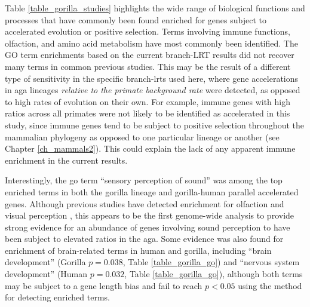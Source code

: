 Table \ref{table_gorilla_studies} highlights the wide range of
biological functions and processes that have commonly been found
enriched for genes subject to accelerated evolution or positive
selection. Terms involving immune functions, olfaction, and amino acid
metabolism have most commonly been identified. The GO term enrichments
based on the current branch-LRT results did not recover many terms in
common previous studies. This may be the result of a different type of
sensitivity in the specific branch-\acp{lrt} used here, where gene
accelerations in \ac{aga} lineages \emph{relative to the primate
  background rate} were detected, as opposed to high rates of
evolution on their own. For example, immune genes with high \dnds
ratios across all primates were not likely to be identified as
accelerated in this study, since immune genes tend to be subject to
positive selection throughout the mammalian phylogeny as opposed to
one particular lineage or another (see Chapter
\ref{ch_mammals2}). This could explain the lack of any apparent immune
enrichment in the current results.

Interestingly, the \ac{go} term ``sensory perception of sound'' was
among the top enriched terms in both the gorilla lineage and
gorilla-human parallel accelerated genes. Although previous studies
have detected enrichment for olfaction and visual perception
\citep{Clark2003,Nielsen2005,Macaque2007}, this appears to be the
first genome-wide analysis to provide strong evidence for an abundance
of genes involving sound perception to have been subject to elevated
\dnds ratios in the \ac{aga}. Some evidence was also found for
enrichment of brain-related terms in human and gorilla, including
``brain development'' (Gorilla $p=0.038$, Table
\ref{table_gorilla_go}) and ``nervous system development'' (Human
$p=0.032$, Table \ref{table_gorilla_go}), although both terms may be
subject to a gene length bias and fail to reach $p<0.05$ using the
\goseq method for detecting enriched terms.

